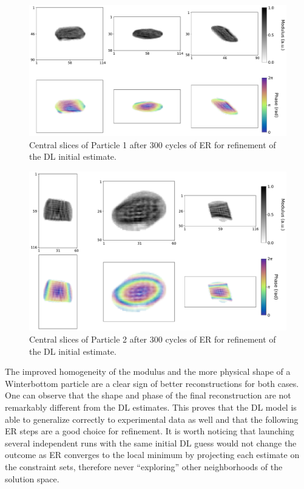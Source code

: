 \begin{figure}[H]
    \centering
    \includegraphics[width=\textwidth]{figures/Phasing/exp_data_dlpynx1.pdf}
    \caption{Central slices of Particle 1 after 300 cycles of ER for refinement of the DL initial estimate. }
    \label{fig:dlpynx_rec1}
\end{figure}

\begin{figure}[H]
    \centering
    \includegraphics[width=\textwidth]{figures/Phasing/exp_data_dlpynx2.pdf}
    \caption{Central slices of Particle 2 after 300 cycles of ER for refinement of the DL initial estimate.}
    \label{fig:dlpynx_rec2}
\end{figure}

The improved homogeneity of the modulus and the more physical shape of a Winterbottom particle are a clear sign of 
better reconstructions for both cases. One can observe that the shape and phase of the final reconstruction are not 
remarkably different from the DL estimates. This proves that the DL model is able to generalize correctly to experimental 
data as well and that the following ER steps are a good choice for refinement. It is worth noticing that launching several 
independent runs with the same initial DL guess would not change the outcome as ER converges to the local minimum by 
projecting each estimate on the constraint sets, therefore never ``exploring'' other neighborhoods of the solution space. \\

